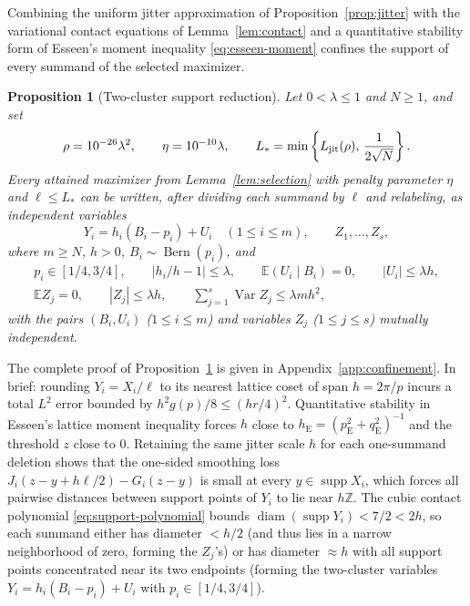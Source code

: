 \documentclass[11pt]{article}
\numberwithin{equation}{section}
\newtheorem{proposition}[theorem]{Proposition}
\theoremstyle{remark}
\DeclareMathOperator{\Var}{Var}
\DeclareMathOperator{\supp}{supp}
\DeclareMathOperator{\Bern}{Bern}
\newcommand{\E}{\mathbb E}
\newcommand{\Z}{\mathbb Z}
\newcommand{\pe}{p_{\mathrm E}}
\newcommand{\qe}{q_{\mathrm E}}
\newcommand{\he}{h_{\mathrm E}}
\begin{document}
Combining the uniform jitter approximation of Proposition~\ref{prop:jitter}
with the variational contact equations of Lemma~\ref{lem:contact} and a
quantitative stability form of Esseen's moment inequality \eqref{eq:esseen-moment}
confines the support of every summand of the selected maximizer.

\begin{proposition}[Two-cluster support reduction]\label{prop:reduction}
Let $0<\lambda\le1$ and $N\ge1$, and set
\begin{equation}\label{eq:reduction-parameters}
 \rho=10^{-26}\lambda^2,\qquad\eta=10^{-10}\lambda,\qquad
 L_* =\min\left\{L_{\rm jit}(\rho),\,\frac1{2\sqrt N}\right\}.
\end{equation}
Every attained maximizer from Lemma~\ref{lem:selection} with penalty parameter
$\eta$ and $\ell\le L_*$ can be written, after dividing each summand by
$\ell$ and relabeling, as independent variables
\begin{equation}\label{eq:clusters}
 Y_i=h_i(B_i-p_i)+U_i\quad(1\le i\le m),\qquad Z_1,\ldots,Z_s,
\end{equation}
where $m\ge N$, $h>0$, $B_i\sim\Bern(p_i)$, and
\begin{gather}
 p_i\in[1/4,3/4],\qquad |h_i/h-1|\le\lambda,\qquad
 \E(U_i\mid B_i)=0,\qquad |U_i|\le\lambda h,              \label{eq:cluster-bounds}\\
 \E Z_j=0,\qquad |Z_j|\le\lambda h,\qquad
                        \sum_{j=1}^s\Var Z_j\le\lambda m h^2, \label{eq:extra-bounds}
\end{gather}
with the pairs $(B_i,U_i)$ ($1\le i\le m$) and variables $Z_j$ ($1\le j\le s$)
mutually independent.
\end{proposition}

The complete proof of Proposition~\ref{prop:reduction} is given in
Appendix~\ref{app:confinement}. In brief: rounding $Y_i=X_i/\ell$ to its
nearest lattice coset of span $h=2\pi/p$ incurs a total $L^2$ error bounded
by $h^2g(p)/8\le(hr/4)^2$. Quantitative stability in Esseen's lattice moment
inequality forces $h$ close to $\he=(\pe^2+\qe^2)^{-1}$ and the threshold $z$
close to $0$. Retaining the same jitter scale $h$ for each one-summand
deletion shows that the one-sided smoothing loss $J_i(z-y+h\ell/2)-G_i(z-y)$
is small at every $y\in\supp X_i$, which forces all pairwise distances
between support points of $Y_i$ to lie near $h\Z$. The cubic contact
polynomial \eqref{eq:support-polynomial} bounds $\operatorname{diam}(\supp Y_i)<7/2<2h$,
so each summand either has diameter $<h/2$ (and thus lies in a narrow
neighborhood of zero, forming the $Z_j$'s) or has diameter $\approx h$ with
all support points concentrated near its two endpoints (forming the
two-cluster variables $Y_i=h_i(B_i-p_i)+U_i$ with $p_i\in[1/4,3/4]$).
\end{document}
